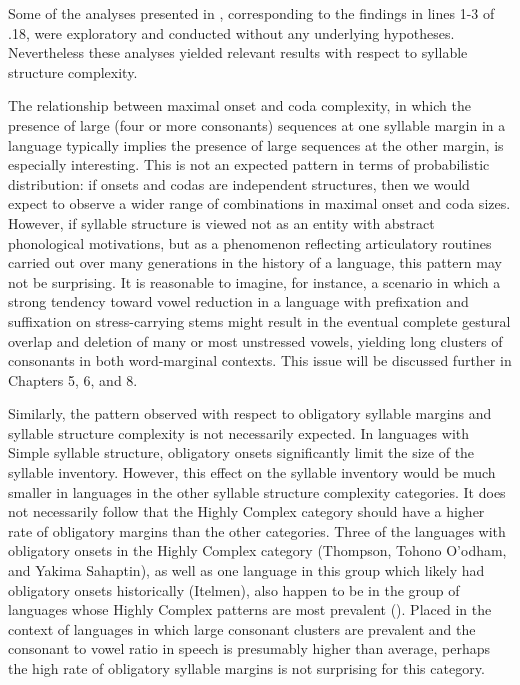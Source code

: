   Some of the analyses presented in , corresponding to the findings in lines 1-3 of .18, were exploratory and conducted without any underlying hypotheses. Nevertheless these analyses yielded relevant results with respect to syllable structure complexity.

  The relationship between maximal onset and coda complexity, in which the presence of large (four or more consonants) sequences at one syllable margin in a language typically implies the presence of large sequences at the other margin, is especially interesting. This is not an expected pattern in terms of probabilistic distribution: if onsets and codas are independent structures, then we would expect to observe a wider range of combinations in maximal onset and coda sizes. However, if syllable structure is viewed not as an entity with abstract phonological motivations, but as a phenomenon reflecting articulatory routines carried out over many generations in the history of a language, this pattern may not be surprising. It is reasonable to imagine, for instance, a scenario in which a strong tendency toward vowel reduction in a language with prefixation and suffixation on stress-carrying stems might result in the eventual complete gestural overlap and deletion of many or most unstressed vowels, yielding long clusters of consonants in both word-marginal contexts. This issue will be discussed further in Chapters 5, 6, and 8.

  Similarly, the pattern observed with respect to obligatory syllable margins and syllable structure complexity is not necessarily expected. In languages with Simple syllable structure, obligatory onsets significantly limit the size of the syllable inventory. However, this effect on the syllable inventory would be much smaller in languages in the other syllable structure complexity categories. It does not necessarily follow that the Highly Complex category should have a higher rate of obligatory margins than the other categories. Three of the languages with obligatory onsets in the Highly Complex category (Thompson, Tohono O’odham, and Yakima Sahaptin), as well as one language in this group which likely had obligatory onsets historically (Itelmen), also happen to be in the group of languages whose Highly Complex patterns are most prevalent (). Placed in the context of languages in which large consonant clusters are prevalent and the consonant to vowel ratio in speech is presumably higher than average, perhaps the high rate of obligatory syllable margins is not surprising for this category.

